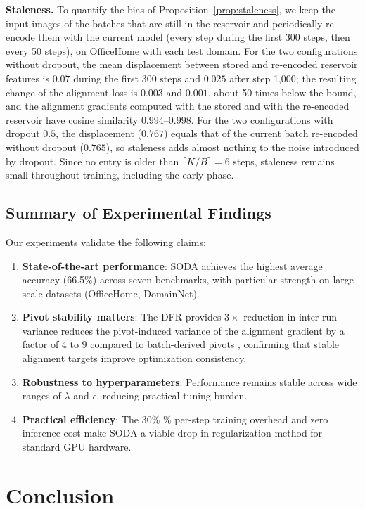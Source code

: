 \documentclass[preprint,12pt]{elsarticle}
\providecommand{\DIFadd}[1]{{\protect\color{blue} \sf #1}} %
\providecommand{\DIFdel}[1]{{\protect\color{red} \scriptsize #1}} %
\providecommand{\DIFaddbegin}{} %
\providecommand{\DIFaddend}{} %
\providecommand{\DIFdelbegin}{} %
\providecommand{\DIFdelend}{} %
\newcommand{\DIFscaledelfig}{0.5}
\newlength{\DIFdelgraphicswidth} %
\newlength{\DIFdelgraphicsheight} %
\newcommand{\DIFaddincludegraphics}[2][]{{\color{blue}\fbox{\DIFOincludegraphics[#1]{#2}}}} %
\newcommand{\DIFdelincludegraphics}[2][]{%
\sbox{\DIFdelgraphicsbox}{\DIFOincludegraphics[#1]{#2}}%
\settoboxwidth{\DIFdelgraphicswidth}{\DIFdelgraphicsbox} %
\settoboxtotalheight{\DIFdelgraphicsheight}{\DIFdelgraphicsbox} %
\scalebox{\DIFscaledelfig}{%
\parbox[b]{\DIFdelgraphicswidth}{\usebox{\DIFdelgraphicsbox}\\[-\baselineskip] \rule{\DIFdelgraphicswidth}{0em}}\llap{\resizebox{\DIFdelgraphicswidth}{\DIFdelgraphicsheight}{%
\setlength{\unitlength}{\DIFdelgraphicswidth}%
\begin{picture}(1,1)%
\thicklines\linethickness{2pt} %
{\color[rgb]{1,0,0}\put(0,0){\framebox(1,1){}}}%
{\color[rgb]{1,0,0}\put(0,0){\line( 1,1){1}}}%
{\color[rgb]{1,0,0}\put(0,1){\line(1,-1){1}}}%
\end{picture}%
}\hspace*{3pt}}} %
} %
\DeclareRobustCommand{\DIFaddbegin}{\DIFOaddbegin \let\includegraphics\DIFaddincludegraphics} %
\DeclareRobustCommand{\DIFaddend}{\DIFOaddend \let\includegraphics\DIFOincludegraphics} %
\DeclareRobustCommand{\DIFdelbegin}{\DIFOdelbegin \let\includegraphics\DIFdelincludegraphics} %
\DeclareRobustCommand{\DIFdelend}{\DIFOaddend \let\includegraphics\DIFOincludegraphics} %
\begin{document}
\DIFaddbegin \DIFadd{\textbf{Staleness.} To quantify the bias of Proposition~\ref{prop:staleness}, we keep the input images of the batches that are still in the reservoir and periodically re-encode them with the current model (every step during the first 300 steps, then every 50 steps), on OfficeHome with each test domain. For the two configurations without dropout, the mean displacement between stored and re-encoded reservoir features is $0.07$ during the first 300 steps and $0.025$ after step 1,000; the resulting change of the alignment loss is $0.003$ and $0.001$, about 50 times below the bound, and the alignment gradients computed with the stored and with the re-encoded reservoir have cosine similarity $0.994$--$0.998$. For the two configurations with dropout $0.5$, the displacement ($0.767$) equals that of the current batch re-encoded without dropout ($0.765$), so staleness adds almost nothing to the noise introduced by dropout. Since no entry is older than $\lceil K/B\rceil=6$ steps, staleness remains small throughout training, including the early phase.
}



\DIFaddend \subsection{Summary of Experimental Findings}

Our experiments validate the following claims:

\begin{enumerate}
    \item \textbf{State-of-the-art performance}: SODA achieves the highest average accuracy (66.5\%) across seven benchmarks, with particular strength on large-scale datasets (OfficeHome, DomainNet).

    \item \textbf{Pivot stability matters}: The DFR \DIFdelbegin \DIFdel{provides $3\times$ reduction in inter-run variance }\DIFdelend \DIFaddbegin \DIFadd{reduces the pivot-induced variance of the alignment gradient by a factor of 4 to 9 }\DIFaddend compared to batch-derived pivots\DIFdelbegin \DIFdel{, confirming that stable alignment targets improve optimization consistency}\DIFdelend .

    \item \textbf{Robustness to hyperparameters}: Performance remains stable across wide ranges of $\lambda$ and $\epsilon$, reducing practical tuning burden.

    
    \item \textbf{Practical efficiency}: The \DIFdelbegin \DIFdel{30\% }\DIFdelend \DIFaddbegin \DIFadd{7\% per-step }\DIFaddend training overhead and zero inference cost make SODA a viable drop-in regularization method for standard GPU hardware.
\end{enumerate} \section{Conclusion}
\label{sec:conclusion}
\end{document}
